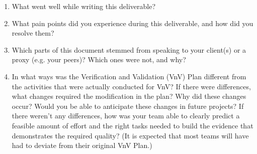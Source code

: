 \documentclass[12pt, titlepage]{article}
\begin{document}
\begin{enumerate}
  \item What went well while writing this deliverable? 
  \item What pain points did you experience during this deliverable, and how
    did you resolve them?
  \item Which parts of this document stemmed from speaking to your client(s) or
  a proxy (e.g. your peers)? Which ones were not, and why?
  \item In what ways was the Verification and Validation (VnV) Plan different
  from the activities that were actually conducted for VnV?  If there were
  differences, what changes required the modification in the plan?  Why did
  these changes occur?  Would you be able to anticipate these changes in future
  projects?  If there weren't any differences, how was your team able to clearly
  predict a feasible amount of effort and the right tasks needed to build the
  evidence that demonstrates the required quality?  (It is expected that most
  teams will have had to deviate from their original VnV Plan.)
\end{enumerate}
\end{document}
